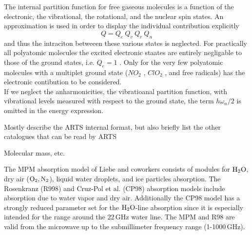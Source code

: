 {The internal partition function for free gaseous molecules is  a
function of the electronic, the vibrational, the rotational, and the
nuclear spin states. An approximation is used in order to display the
individual contribution explicitly
\begin{equation}
 Q=Q_e~Q_v~Q_r~Q_n
\label{}
\end{equation}
and thus the intraciton betweeen these various states is neglected. For
practically all polyatomic molecules the excited electronic staates
are entirely negligable to those of the ground states,
i.e. $Q_e=1$ . Only for the very few polyatomic molecules with a
multiplet ground state ($NO_2$ , $ClO_2$ , and free radicals) has the
electronic contibution to be considered.\\
If we neglect the anharmonicities, the vibratioanal partition
function, with vibrational levels measured with respect to the ground
state, the term $h\omega_n/2$ is omitted in the energy expression.




























Mostly describe the ARTS internal format, but also briefly list the
other catalogues that can be read by ARTS


Molecular mass, etc. 


%
%
%
%
\label{levelb:CompAbsMod}
%
The MPM absorption model of Liebe and coworkers consists of modules for 
$\mbox{H}_2\mbox{O}$, dry air ($\mbox{O}_2, \mbox{N}_2$), liquid water droplets, and ice particles 
absorption. The Rosenkranz (R998) and Cruz-Pol et al. (CP98) absorption 
models include absorption due to water vapor and dry air. Additionally 
the CP98 model has a strongly reduced parameter set for the $\mbox{H}_2\mbox{O}$-line 
absorption since it is especially intended for the range around the 
22\,GHz water line. The MPM and R98 are valid from the microwave 
up to the submillimeter frequency range (1-1000\,GHz).

}
